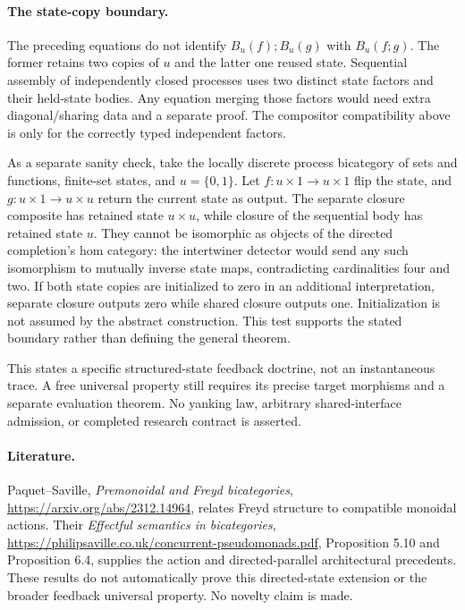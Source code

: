\documentclass[11pt]{article}
\begin{document}
\paragraph{The state-copy boundary.}
The preceding equations do not identify $B_u(f);B_u(g)$ with $B_u(f;g)$. The former retains two copies of $u$ and the latter one reused state. Sequential assembly of independently closed processes uses two distinct state factors and their held-state bodies. Any equation merging those factors would need extra diagonal/sharing data and a separate proof. The compositor compatibility above is only for the correctly typed independent factors.

As a separate sanity check, take the locally discrete process bicategory of sets and functions, finite-set states, and $u=\{0,1\}$. Let $f:u\times1\to u\times1$ flip the state, and $g:u\times1\to u\times u$ return the current state as output. The separate closure composite has retained state $u\times u$, while closure of the sequential body has retained state $u$. They cannot be isomorphic as objects of the directed completion's hom category: the intertwiner detector would send any such isomorphism to mutually inverse state maps, contradicting cardinalities four and two. If both state copies are initialized to zero in an additional interpretation, separate closure outputs zero while shared closure outputs one. Initialization is not assumed by the abstract construction. This test supports the stated boundary rather than defining the general theorem.

This states a specific structured-state feedback doctrine, not an instantaneous trace. A free universal property still requires its precise target morphisms and a separate evaluation theorem. No yanking law, arbitrary shared-interface admission, or completed research contract is asserted.

\paragraph{Literature.} Paquet--Saville, \emph{Premonoidal and Freyd bicategories}, \url{https://arxiv.org/abs/2312.14964}, relates Freyd structure to compatible monoidal actions. Their \emph{Effectful semantics in bicategories}, \url{https://philipsaville.co.uk/concurrent-pseudomonads.pdf}, Proposition 5.10 and Proposition 6.4, supplies the action and directed-parallel architectural precedents. These results do not automatically prove this directed-state extension or the broader feedback universal property. No novelty claim is made.
\end{document}
